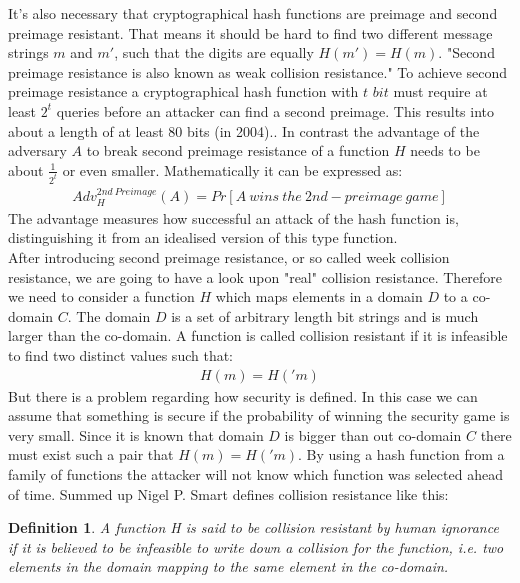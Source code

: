 \documentclass[a4paper,11pt, twoside]{article}
\begin{document}
It's also necessary that cryptographical hash functions are preimage and second preimage resistant. That means it should be hard to find two different message strings $m$ and $m'$, such that the digits are equally $H(m') = H(m)$. "Second preimage resistance is also known as weak collision resistance." \cite{Preneel2005} To achieve second preimage resistance a cryptographical hash function with $t$ $bit$ must require at least $2^t$ queries before an attacker can find a second preimage. This results into about a length of at least 80 bits (in 2004).\cite{Preneel2005}. In contrast the advantage of the adversary $A$ to break second preimage resistance of a function $H$ needs to be about $\frac{1}{2^t}$ or even smaller.\newline
Mathematically it can be expressed as: 
\begin{align*}
    Adv_H^{2nd\ Preimage} (A) = Pr[A\ wins\ the\ 2nd-preimage\ game]
\end{align*}
The advantage measures how successful an attack of the hash function is, distinguishing it from an idealised version of this type function.\cite{advantage}\newline\\[0.1cm]
After introducing second preimage resistance, or so called week collision resistance, we are going to have a look upon "real" collision resistance. Therefore we need to consider a function $H$ which maps elements in a domain $D$ to a co-domain $C$. The domain $D$ is a set of arbitrary length bit strings and is much larger than the co-domain. A function is called collision resistant if it is infeasible to find two distinct values such that:
\begin{align*}
    H(m) = H('m)
\end{align*}
But there is a problem regarding how security is defined. In this case we can assume that something is secure if the probability of winning the security game is very small.\newline
Since it is known that domain $D$ is bigger than out co-domain $C$ there must exist such a pair that $H(m) = H('m)$. By using a hash function from a family of functions the attacker will not know which function was selected ahead of time. Summed up Nigel P. Smart defines collision resistance like this:
\newtheorem{mydef}{Definition}
\begin{mydef}
    A function H is said to be collision resistant by human ignorance if it is believed to be infeasible to write down a collision for the function, i.e. two elements in the domain mapping to the same element in the co-domain.
\end{mydef}
\end{document}
